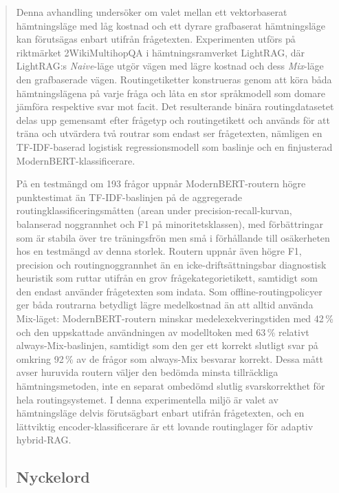 \documentclass[english, bibtex]{kththesis}               %
\newcommand*{\sweExpl}[1]{\todo[inline, backgroundcolor=kth-lightblue40]{#1}}  %
\renewcommand\sweExpl[1]{}
\numberwithin{listing}{chapter}
\begin{document}
\begin{abstract}
\begin{scontents}[store-env=abstracts,print-env=true]
Denna avhandling undersöker om valet mellan ett vektorbaserat hämtningsläge med låg kostnad och ett dyrare grafbaserat hämtningsläge kan förutsägas enbart utifrån frågetexten. Experimenten utförs på riktmärket 2WikiMultihopQA i hämtningsramverket LightRAG, där LightRAG:s \emph{Naive}-läge utgör vägen med lägre kostnad och dess \emph{Mix}-läge den grafbaserade vägen. Routingetiketter konstrueras genom att köra båda hämtningslägena på varje fråga och låta en stor språkmodell som domare jämföra respektive svar mot facit. Det resulterande binära routingdatasetet delas upp gemensamt efter frågetyp och routingetikett och används för att träna och utvärdera två routrar som endast ser frågetexten, nämligen en TF-IDF-baserad logistisk regressionsmodell som baslinje och en finjusterad ModernBERT-klassificerare.

På en testmängd om 193 frågor uppnår ModernBERT-routern högre punktestimat än TF-IDF-baslinjen på de aggregerade routingklassificeringsmåtten (arean under precision-recall-kurvan, balanserad noggrannhet och F1 på minoritetsklassen), med förbättringar som är stabila över tre träningsfrön men små i förhållande till osäkerheten hos en testmängd av denna storlek. Routern uppnår även högre F1, precision och routingnoggrannhet än en icke-driftsättningsbar diagnostisk heuristik som ruttar utifrån en grov frågekategorietikett, samtidigt som den endast använder frågetexten som indata. Som offline-routingpolicyer ger båda routrarna betydligt lägre medelkostnad än att alltid använda Mix-läget: ModernBERT-routern minskar medelexekveringstiden med 42\,\% och den uppskattade användningen av modelltoken med 63\,\% relativt always-Mix-baslinjen, samtidigt som den ger ett korrekt slutligt svar på omkring 92\,\% av de frågor som always-Mix besvarar korrekt. Dessa mått avser huruvida routern väljer den bedömda minsta tillräckliga hämtningsmetoden, inte en separat ombedömd slutlig svarskorrekthet för hela routingsystemet. I denna experimentella miljö är valet av hämtningsläge delvis förutsägbart enbart utifrån frågetexten, och en lättviktig encoder-klassificerare är ett lovande routinglager för adaptiv hybrid-RAG.
\end{scontents}
\subsection*{Nyckelord}
\begin{scontents}[store-env=keywords,print-env=true]
\end{scontents}
\sweExpl{Nyckelord som beskriver innehållet i uppsatsen eller rapporten}
\end{abstract}
\cleardoublepage
{}
\end{document}
